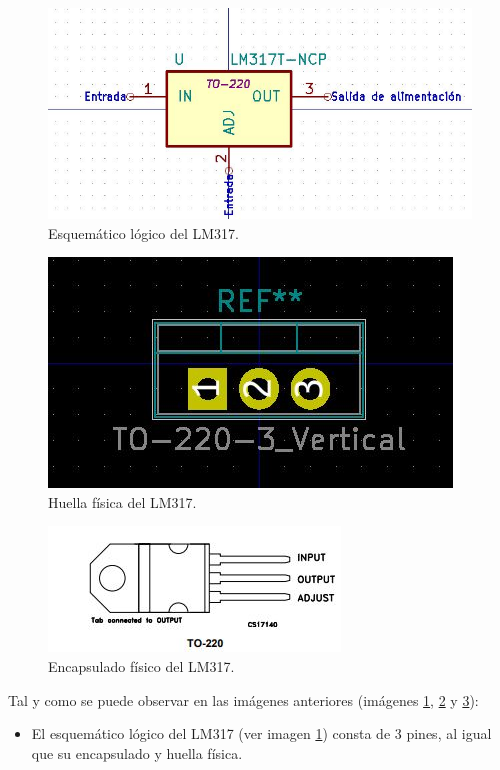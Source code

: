\begin{itemize}
    \begin{figure}[H]
    \centering 
    \includegraphics[width=0.65\linewidth]{pictures/FailPinout2.JPG}
    \caption{Esquemático lógico del LM317.}
    \label{fig:Logico_LM317}
    \end{figure}
    
    \begin{figure}[H]
    \centering 
    \includegraphics[width=0.55\linewidth]{pictures/FailPinout3.JPG}
    \caption{Huella física del LM317.}
    \label{fig:Huella_LM317}
    \end{figure}
    
    \begin{figure}[H]
    \centering 
    \includegraphics[width=0.65\linewidth]{pictures/FailPinout.JPG}
    \caption{Encapsulado físico del LM317.}
    \label{fig:Encapsulado_LM317}
    \end{figure}
    
    Tal y como se puede observar en las imágenes anteriores (imágenes \ref{fig:Logico_LM317}, \ref{fig:Huella_LM317} y \ref{fig:Encapsulado_LM317}):
    
    \begin{itemize}
    
        \item El esquemático lógico del LM317 (ver imagen \ref{fig:Logico_LM317}) consta de 3 pines, al igual que su encapsulado y huella física.
        

\end{itemize}
\end{itemize}
